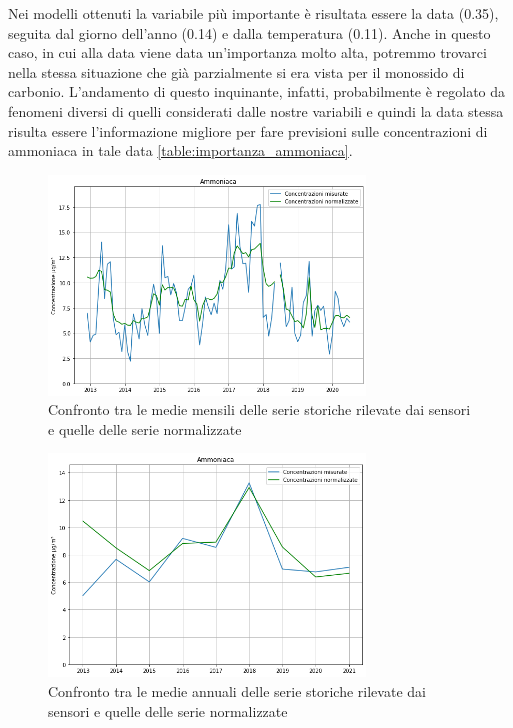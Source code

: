 Nei modelli ottenuti la variabile più importante è risultata essere la data (0.35), seguita dal giorno dell'anno (0.14) e dalla temperatura (0.11). Anche in questo caso, in cui alla data viene data un'importanza molto alta, potremmo trovarci nella stessa situazione che già parzialmente si era vista per il monossido di carbonio. L'andamento di questo inquinante, infatti, probabilmente è regolato da fenomeni diversi di quelli considerati dalle nostre variabili e quindi la data stessa risulta essere l'informazione migliore per fare previsioni sulle concentrazioni di ammoniaca in tale data \ref{table:importanza_ammoniaca}.

\begin{figure}[h]
\centering
\includegraphics[width=0.75\textwidth]{ammoniaca_medie_mensili}
\caption{Confronto tra le medie mensili delle serie storiche rilevate dai sensori e quelle delle serie normalizzate}
\label{fig:ammoniaca_medie_mensili}
\end{figure}

\begin{figure}[h]
\centering
\includegraphics[width=0.75\textwidth]{ammoniaca_medie_annuali}
\caption{Confronto tra le medie annuali delle serie storiche rilevate dai sensori e quelle delle serie normalizzate}
\label{fig:ammoniaca_medie_annuali}
\end{figure}

